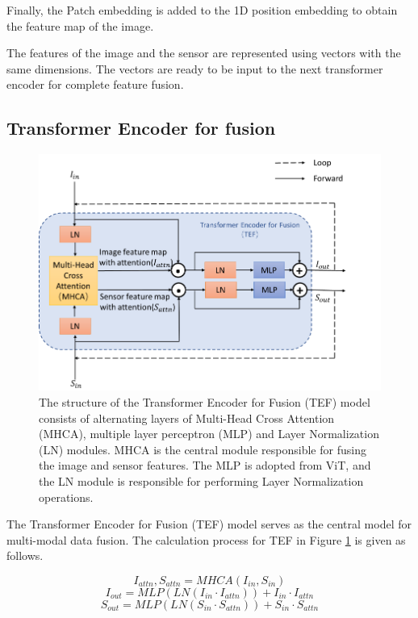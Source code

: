 \documentclass[acmsmall,manuscript, screen, review]{acmart}
\begin{document}
Finally, the Patch embedding is added to the 1D position embedding to obtain the feature map of the image.

The features of the image and the sensor are represented using vectors with the same dimensions. The vectors are ready to be input to the next transformer encoder for complete feature fusion.



\subsection{Transformer Encoder for fusion}
\begin{figure}[htbp]
  \centering
  \includegraphics[width=0.8\linewidth]{pic/model_structure_TEF.png}
  \caption{The structure of the Transformer Encoder for Fusion (TEF) model consists of alternating layers of Multi-Head Cross Attention (MHCA), multiple layer perceptron (MLP) and Layer Normalization (LN) modules. MHCA is the central module responsible for fusing the image and sensor features. The MLP is adopted from ViT, and the LN module is responsible for performing Layer Normalization operations.}
  \label{model_structure_TEF}
\end{figure}




The Transformer Encoder for Fusion (TEF) model serves as the central model for multi-modal data fusion. The calculation process for TEF in Figure \ref{model_structure_TEF} is given as follows.


\begin{equation}
  I_{attn},S_{attn}=MHCA\left(I_{in},S_{in}\right)
\end{equation}
\begin{equation}
  I_{out}=MLP\left(LN\left(I_{in}\cdot I_{attn}\right)\right)+I_{in}\cdot I_{attn}
\end{equation}
\begin{equation}
  S_{out}=MLP\left(LN\left(S_{in}\cdot S_{attn}\right)\right)+S_{in}\cdot S_{attn}
\end{equation}
\end{document}
